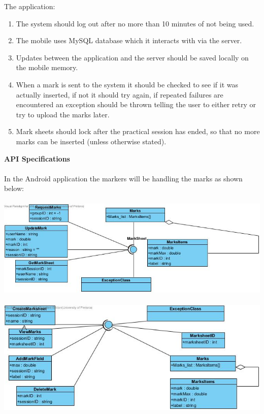 \documentclass[12pt,a4paper]{article}
\begin{document}
 

 The application:

\begin{enumerate}
\item  The system should log out after no more than 10 minutes of not being used. 

\item  The mobile uses MySQL database which it interacts with via the server. 

\item  Updates between the application and the server should be saved locally on the mobile memory.

\item  When a mark is sent to the system it should be checked to see if it was actually inserted, if not it should try again, if repeated failures are encountered an exception should be thrown telling the user to either retry or try to upload the marks later. 

\item  Mark sheets should lock after the practical session has ended, so that no more marks can be inserted (unless otherwise stated). 
\end{enumerate}

\noindent \textbf{API Specifications}\\\\
In the Android application the markers will be handling the marks as shown below:\\\\
\includegraphics[scale=0.6]{APIMarks.jpg}\\\\
\includegraphics[scale=0.6]{APIMarksheet.jpg}\\
\end{document}
